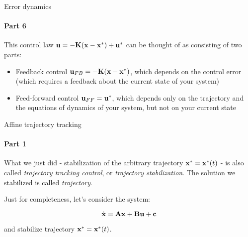 \documentclass{beamer}
\begin{document}
\begin{frame}{Error dynamics}
\framesubtitle{Part 6}
\begin{flushleft}

This control law $\mathbf{u} = -\mathbf{K}(\mathbf{x} - \mathbf{x}^*) + \mathbf{u}^*$ can be thought of as consisting of two parts:

\begin{itemize}
    \item Feedback control $\mathbf{u}_{FB} = -\mathbf{K}(\mathbf{x} - \mathbf{x}^*)$, which depends on the control error (which requires a feedback about the current state of your system)
    \item Feed-forward control $\mathbf{u}_{FF} = \mathbf{u}^*$, which depends only on the trajectory and the equations of dynamics of your system, but not on your current state
\end{itemize}

\end{flushleft}
\end{frame}




\begin{frame}{Affine trajectory tracking}
\framesubtitle{Part 1}
\begin{flushleft}

What we just did - stabilization of the arbitrary trajectory $\mathbf{x}^* = \mathbf{x}^*(t)$ - is also called \emph{trajectory tracking control}, or \emph{trajectory stabilization}. The solution we stabilized is called \emph{trajectory}.

\bigskip

Just for completeness, let's consider the system:

\begin{equation}
\label{eq:AffineErrorDynamics_1}
    \dot{\mathbf{x}} = \mathbf{A}\mathbf{x} + \mathbf{B}\mathbf{u} + \mathbf{c}
\end{equation}

and stabilize trajectory $\mathbf{x}^* = \mathbf{x}^*(t)$.

\end{flushleft}
\end{frame}
\end{document}
